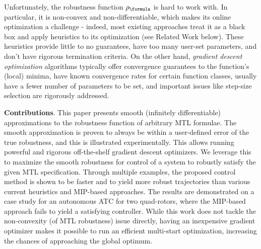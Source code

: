 Unfortunately, the robustness function $\robf$ is hard to work with.
In particular, it is non-convex and non-differentiable, which makes its online optimization a challenge - indeed, most existing approaches treat it as a black box and apply heuristics to its optimization (see Related Work below).
These heuristics provide little to no guarantees, have too many user-set parameters, and don't have rigorous termination criteria.
On the other hand, \textit{gradient descent optimization} algorithms typically offer convergence guarantees to the function's (local) minima, have known convergence rates for certain function classes, usually have a fewer number of parameters to be set, and important issues like step-size selection are rigorously addressed.

\noindent \textbf{Contributions}. This paper presents smooth (infinitely differentiable) approximations to the robustness function of arbitrary MTL formulae.
The smooth approximation is proven to always be within a user-defined error of the true robustness, and this is illustrated experimentally.
This allows running powerful and rigorous off-the-shelf gradient descent optimizers.
We leverage this to maximize the smooth robustness for control of a system to robustly satisfy the given MTL specification.
Through multiple examples, the proposed control method is shown to be faster and to yield more robust trajectories than various current heuristics and MIP-based approaches. 
The results are demonstrated on a case study for an autonomous ATC for two quad-rotors, where the MIP-based approach fails to yield a satisfying controller.
While this work does not tackle the non-convexity (of MTL robustness) issue directly, having an inexpensive gradient optimizer makes it possible to run an efficient multi-start optimization, increasing the chances of approaching the global optimum.

